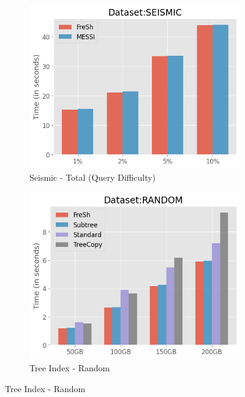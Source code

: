 
\begin{figure}[htbp]
    \centering
    \begin{subfigure}{0.45\textwidth}
        \includegraphics[width=\textwidth]{figures/Experiments/scale-query-difficulty-seismic-total.png}
        \caption{Seismic - Total (Query Difficulty)}
        \label{fig:eval:scale-query-difficulty:seismic:total}
    \end{subfigure}    
    \begin{subfigure}{0.45\textwidth}
        \includegraphics[width=\textwidth]{figures/Experiments/scale-dataset-tree-index-random.png}
        \caption{Tree Index - Random}
        \label{fig:eval:scale-dataset:tree-index:random}
    \end{subfigure}    


\end{figure}
